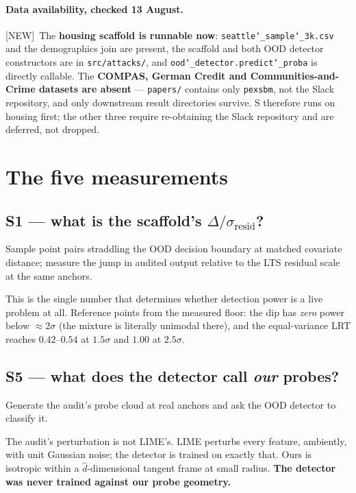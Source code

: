 \documentclass[11pt]{article}
\newcommand{\provtag}[2]{{\footnotesize\sffamily\textcolor{#1}{[#2]}}}
\newcommand{\NEWT}{\provtag{newmag}{NEW}}
\begin{document}
\paragraph{Data availability, checked 13 August.} \NEWT\ The \textbf{housing scaffold is
runnable now}: \texttt{seattle\char`_sample\char`_3k.csv} and the demographics join are present, the
scaffold and both OOD detector constructors are in \texttt{src/attacks/}, and
\texttt{ood\char`_detector.}\allowbreak\texttt{predict\char`_proba} is directly callable. The \textbf{COMPAS, German Credit
and Communities-and-Crime datasets are absent} --- \texttt{papers/} contains only
\texttt{pexsbm}, not the Slack repository, and only downstream result directories survive. S
therefore runs on housing first; the other three require re-obtaining the Slack repository and
are deferred, not dropped.

\section{The five measurements}

\subsection*{S1 --- what is the scaffold's $\Delta/\sigma_{\text{resid}}$?}

Sample point pairs straddling the OOD decision boundary at matched covariate distance; measure
the jump in audited output relative to the LTS residual scale at the same anchors.

This is the single number that determines whether detection power is a live problem at all.
Reference points from the measured floor: the dip has \emph{zero} power below $\approx 2\sigma$
(the mixture is literally unimodal there), and the equal-variance LRT reaches $0.42$--$0.54$ at
$1.5\sigma$ and $1.00$ at $2.5\sigma$.

\subsection*{S5 --- what does the detector call \emph{our} probes?}

Generate the audit's probe cloud at real anchors and ask the OOD detector to classify it.

The audit's perturbation is not LIME's. LIME perturbs every feature, ambiently, with unit
Gaussian noise; the detector is trained on exactly that. Ours is isotropic within a
$\hat d$-dimensional tangent frame at small radius. \textbf{The detector was never trained
against our probe geometry.}
\end{document}
